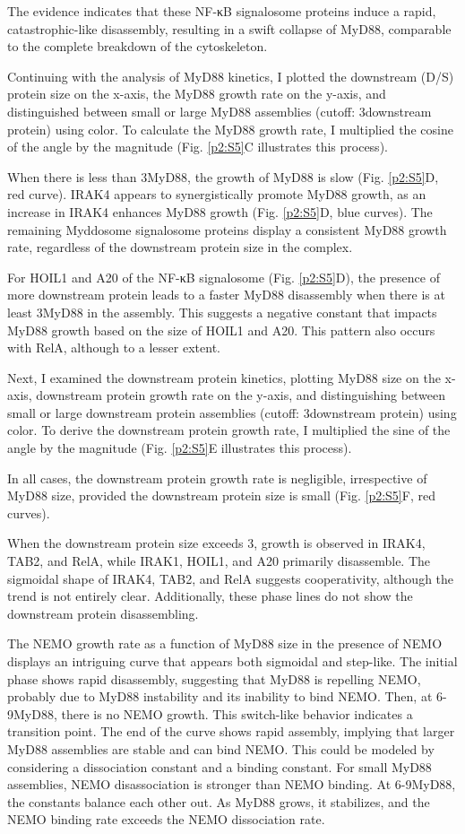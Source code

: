 The evidence indicates that these NF-κB signalosome proteins induce a rapid, catastrophic-like disassembly, resulting in a swift collapse of MyD88, comparable to the complete breakdown of the cytoskeleton.

Continuing with the analysis of MyD88 kinetics, I plotted the downstream (D/S) protein size on the x-axis, the MyD88 growth rate on the y-axis, and distinguished between small or large MyD88 assemblies (cutoff: 3\times downstream protein) using color. To calculate the MyD88 growth rate, I multiplied the cosine of the angle by the magnitude (Fig. \ref{p2:S5}C illustrates this process).

When there is less than 3\times MyD88, the growth of MyD88 is slow (Fig. \ref{p2:S5}D, red curve). IRAK4 appears to synergistically promote MyD88 growth, as an increase in IRAK4 enhances MyD88 growth (Fig. \ref{p2:S5}D, blue curves). The remaining Myddosome signalosome proteins display a consistent MyD88 growth rate, regardless of the downstream protein size in the complex.

For HOIL1 and A20 of the NF-κB signalosome (Fig. \ref{p2:S5}D), the presence of more downstream protein leads to a faster MyD88 disassembly when there is at least 3\times MyD88 in the assembly. This suggests a negative constant that impacts MyD88 growth based on the size of HOIL1 and A20. This pattern also occurs with RelA, although to a lesser extent.

Next, I examined the downstream protein kinetics, plotting MyD88 size on the x-axis, downstream protein growth rate on the y-axis, and distinguishing between small or large downstream protein assemblies (cutoff: 3\times downstream protein) using color. To derive the downstream protein growth rate, I multiplied the sine of the angle by the magnitude (Fig. \ref{p2:S5}E illustrates this process).

In all cases, the downstream protein growth rate is negligible, irrespective of MyD88 size, provided the downstream protein size is small (Fig. \ref{p2:S5}F, red curves).

When the downstream protein size exceeds 3\times, growth is observed in IRAK4, TAB2, and RelA, while IRAK1, HOIL1, and A20 primarily disassemble. The sigmoidal shape of IRAK4, TAB2, and RelA suggests cooperativity, although the trend is not entirely clear. Additionally, these phase lines do not show the downstream protein disassembling.

The NEMO growth rate as a function of MyD88 size in the presence of NEMO displays an intriguing curve that appears both sigmoidal and step-like. The initial phase shows rapid disassembly, suggesting that MyD88 is repelling NEMO, probably due to MyD88 instability and its inability to bind NEMO. Then, at 6-9\times MyD88, there is no NEMO growth. This switch-like behavior indicates a transition point. The end of the curve shows rapid assembly, implying that larger MyD88 assemblies are stable and can bind NEMO. This could be modeled by considering a dissociation constant and a binding constant. For small MyD88 assemblies, NEMO disassociation is stronger than NEMO binding. At 6-9\times MyD88, the constants balance each other out. As MyD88 grows, it stabilizes, and the NEMO binding rate exceeds the NEMO dissociation rate.

